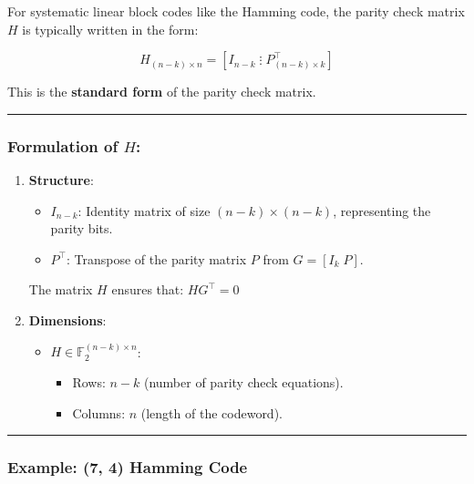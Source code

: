 \documentclass[11pt]{article}
\providecommand{\tightlist}{%
      \setlength{\itemsep}{0pt}\setlength{\parskip}{0pt}}
\begin{document}
For systematic linear block codes like the Hamming code, the parity
check matrix \(H\) is typically written in the form:

\[\boxed{H_{(n-k) \times n} = [I_{n-k} \; \vdots \; P_{(n-k) \times k}^\top]}\]

This is the \textbf{standard form} of the parity check matrix.

\begin{center}\rule{0.5\linewidth}{0.5pt}\end{center}

\subsubsection{\texorpdfstring{Formulation of
\(H\):}{Formulation of H:}}\label{formulation-of-h}

\begin{enumerate}
\def\labelenumi{\arabic{enumi}.}
\item
  \textbf{Structure}:

  \begin{itemize}
  \tightlist
  \item
    \(I_{n-k}\): Identity matrix of size \((n-k) \times (n-k)\),
    representing the parity bits.
  \item
    \(P^\top\): Transpose of the parity matrix \(P\) from
    \(G = [I_k \; P]\).
  \end{itemize}

  The matrix \(H\) ensures that: \(H G^\top = 0\)
\item
  \textbf{Dimensions}:

  \begin{itemize}
  \tightlist
  \item
    \(H \in \mathbb{F}_2^{(n-k) \times n}\):

    \begin{itemize}
    \tightlist
    \item
      Rows: \(n-k\) (number of parity check equations).
    \item
      Columns: \(n\) (length of the codeword).
    \end{itemize}
  \end{itemize}
\end{enumerate}

\begin{center}\rule{0.5\linewidth}{0.5pt}\end{center}

\subsubsection{Example: (7, 4) Hamming
Code}\label{example-7-4-hamming-code}
\end{document}
